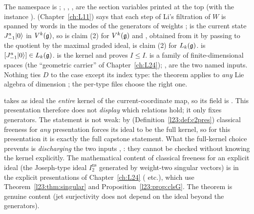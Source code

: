 \begin{dictionary}
The namespace is ; , , ,  are the section variables printed at
the top (with the instance \lean{[FiniteDimensional ℂ 𝔤]}).  (Chapter~\ref{ch:L11}) says that each
step of Li's filtration of $W$ is spanned by words in the modes of the generators  of weights ;  is the
current state $J^a_{-1}|0\rangle$ in $V^k(\mathfrak g)$, so  is claim (2) for $V^k(\mathfrak g)$ and , obtained from it
by passing to the quotient by the maximal graded ideal, is claim (2) for $L_k(\mathfrak g)$. 
is $[J^a_{-1}|0\rangle]\in L_k(\mathfrak g)$.  is the kernel and  proves $I\le I$.  is a family of
finite-dimensional spaces (the ``geometric carrier'' of Chapter~\ref{ch:L24}); ,  are the two named inputs. Nothing ties
$D$ to the case except its index type: the theorem applies to \emph{any} Lie algebra of dimension ; the
per-type files choose the right one.
\end{dictionary}

\begin{warning}[title={Trap: The general presentation uses the full kernel}]\label{l23:warn:fullkernel}
 takes as ideal the \emph{entire} kernel of the current-coordinate map, so its  field is
. This presentation therefore does not \emph{display} which relations hold; it only fixes generators. The statement
 is not weak: by 
(Definition~\ref{l23:def:c2pres}) classical freeness for \emph{any} presentation forces its ideal to be the full kernel, so for this
presentation it is exactly the full capstone statement. What the full-kernel choice prevents is \emph{discharging} the two inputs
, : they cannot be checked without knowing the kernel explicitly. The mathematical content of
classical freeness for an explicit ideal (the Joseph-type ideal $I_2^{\mathrm{ns}}$ generated by weight-two singular vectors) is in the explicit
presentations of Chapter~\ref{ch:L24} ( etc.), which use Theorem~\ref{l23:thm:singular} and
Proposition~\ref{l23:prop:clsG}. The theorem  is genuine content (jet surjectivity does not depend on the ideal
beyond the generators).
\end{warning}

